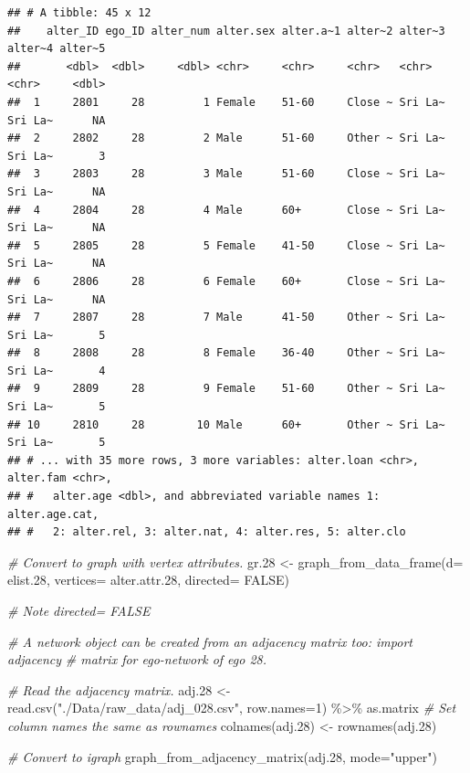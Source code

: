 \documentclass[
]{book}
\newenvironment{Shaded}{\begin{snugshade}}{\end{snugshade}}
\newcommand{\AttributeTok}[1]{\textcolor[rgb]{0.77,0.63,0.00}{#1}}
\newcommand{\CommentTok}[1]{\textcolor[rgb]{0.56,0.35,0.01}{\textit{#1}}}
\newcommand{\ConstantTok}[1]{\textcolor[rgb]{0.00,0.00,0.00}{#1}}
\newcommand{\DecValTok}[1]{\textcolor[rgb]{0.00,0.00,0.81}{#1}}
\newcommand{\FloatTok}[1]{\textcolor[rgb]{0.00,0.00,0.81}{#1}}
\newcommand{\FunctionTok}[1]{\textcolor[rgb]{0.00,0.00,0.00}{#1}}
\newcommand{\NormalTok}[1]{#1}
\newcommand{\OtherTok}[1]{\textcolor[rgb]{0.56,0.35,0.01}{#1}}
\newcommand{\SpecialCharTok}[1]{\textcolor[rgb]{0.00,0.00,0.00}{#1}}
\newcommand{\StringTok}[1]{\textcolor[rgb]{0.31,0.60,0.02}{#1}}
\begin{document}
\begin{verbatim}
## # A tibble: 45 x 12
##    alter_ID ego_ID alter_num alter.sex alter.a~1 alter~2 alter~3 alter~4 alter~5
##       <dbl>  <dbl>     <dbl> <chr>     <chr>     <chr>   <chr>   <chr>     <dbl>
##  1     2801     28         1 Female    51-60     Close ~ Sri La~ Sri La~      NA
##  2     2802     28         2 Male      51-60     Other ~ Sri La~ Sri La~       3
##  3     2803     28         3 Male      51-60     Close ~ Sri La~ Sri La~      NA
##  4     2804     28         4 Male      60+       Close ~ Sri La~ Sri La~      NA
##  5     2805     28         5 Female    41-50     Close ~ Sri La~ Sri La~      NA
##  6     2806     28         6 Female    60+       Close ~ Sri La~ Sri La~      NA
##  7     2807     28         7 Male      41-50     Other ~ Sri La~ Sri La~       5
##  8     2808     28         8 Female    36-40     Other ~ Sri La~ Sri La~       4
##  9     2809     28         9 Female    51-60     Other ~ Sri La~ Sri La~       5
## 10     2810     28        10 Male      60+       Other ~ Sri La~ Sri La~       5
## # ... with 35 more rows, 3 more variables: alter.loan <chr>, alter.fam <chr>,
## #   alter.age <dbl>, and abbreviated variable names 1: alter.age.cat,
## #   2: alter.rel, 3: alter.nat, 4: alter.res, 5: alter.clo
\end{verbatim}

\begin{Shaded}
\begin{Highlighting}[]
\CommentTok{\# Convert to graph with vertex attributes.}
\NormalTok{gr}\FloatTok{.28} \OtherTok{\textless{}{-}} \FunctionTok{graph\_from\_data\_frame}\NormalTok{(}\AttributeTok{d=}\NormalTok{ elist}\FloatTok{.28}\NormalTok{, }\AttributeTok{vertices=}\NormalTok{ alter.attr}\FloatTok{.28}\NormalTok{, }\AttributeTok{directed=} \ConstantTok{FALSE}\NormalTok{)}

\CommentTok{\# Note directed= FALSE}

\CommentTok{\# A network object can be created from an adjacency matrix too: import adjacency}
\CommentTok{\# matrix for ego{-}network of ego 28.}

\CommentTok{\# Read the adjacency matrix.}
\NormalTok{adj}\FloatTok{.28} \OtherTok{\textless{}{-}} \FunctionTok{read.csv}\NormalTok{(}\StringTok{"./Data/raw\_data/adj\_028.csv"}\NormalTok{, }\AttributeTok{row.names=}\DecValTok{1}\NormalTok{) }\SpecialCharTok{\%\textgreater{}\%} 
\NormalTok{  as.matrix}
\CommentTok{\# Set column names the same as rownames}
\FunctionTok{colnames}\NormalTok{(adj}\FloatTok{.28}\NormalTok{) }\OtherTok{\textless{}{-}} \FunctionTok{rownames}\NormalTok{(adj}\FloatTok{.28}\NormalTok{)}

\CommentTok{\# Convert to igraph}
\FunctionTok{graph\_from\_adjacency\_matrix}\NormalTok{(adj}\FloatTok{.28}\NormalTok{, }\AttributeTok{mode=}\StringTok{"upper"}\NormalTok{)}
\end{Highlighting}
\end{Shaded}
\end{document}
